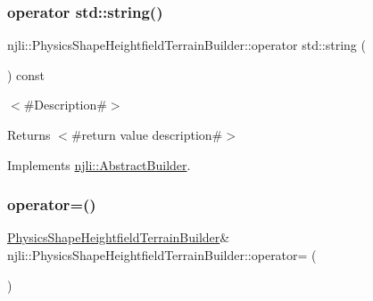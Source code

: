 \subsubsection{\texorpdfstring{operator std\+::string()}{operator std::string()}}
{\footnotesize\ttfamily njli\+::\+Physics\+Shape\+Heightfield\+Terrain\+Builder\+::operator std\+::string (\begin{DoxyParamCaption}{ }\end{DoxyParamCaption}) const\hspace{0.3cm}{\ttfamily [virtual]}}

$<$\#\+Description\#$>$

\begin{DoxyReturn}{Returns}
$<$\#return value description\#$>$ 
\end{DoxyReturn}


Implements \mbox{\hyperlink{classnjli_1_1_abstract_builder_a3e6e553e06d1ca30517ad5fb0bd4d000}{njli\+::\+Abstract\+Builder}}.

\mbox{\label{classnjli_1_1_physics_shape_heightfield_terrain_builder_a4b32869293f1b723f7bdced4aaab92c1}} 
\subsubsection{\texorpdfstring{operator=()}{operator=()}}
{\footnotesize\ttfamily \mbox{\hyperlink{classnjli_1_1_physics_shape_heightfield_terrain_builder}{Physics\+Shape\+Heightfield\+Terrain\+Builder}}\& njli\+::\+Physics\+Shape\+Heightfield\+Terrain\+Builder\+::operator= (\begin{DoxyParamCaption}\item[{const \mbox{\hyperlink{classnjli_1_1_physics_shape_heightfield_terrain_builder}{Physics\+Shape\+Heightfield\+Terrain\+Builder}} \&}]{ }\end{DoxyParamCaption})\hspace{0.3cm}{\ttfamily [protected]}}

\mbox{\label{classnjli_1_1_physics_shape_heightfield_terrain_builder_a669b6c5d74788b88902c69a54ee59e9c}} 
